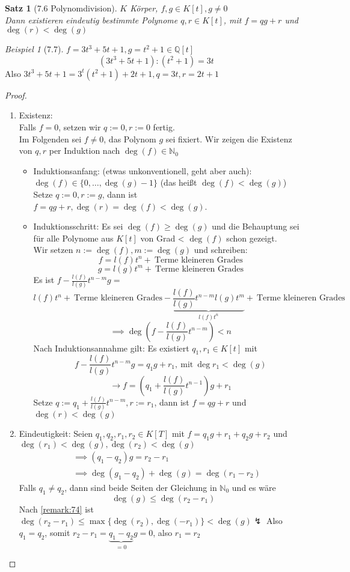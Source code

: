 \documentclass[a4paper]{scrartcl}
\theoremstyle{definition}
\theoremstyle{plain}
\newtheorem{thm}{Satz}
\theoremstyle{plain}
\theoremstyle{remark}
\theoremstyle{remark}
\theoremstyle{remark}
\theoremstyle{remark}
\theoremstyle{remark}
\newtheorem{ex}{Beispiel}
\begin{document}
\begin{thm}[7.6 Polynomdivision]
\label{thm:poly_div}
$K$ Körper, $f,g\in K[t], g\neq 0$ \\
  Dann existieren eindeutig bestimmte Polynome $q,r \in K[t]$, mit $f = q g + r$ und $\deg(r) < \deg(g)$
\end{thm}

\begin{ex}[7.7]
$f = 3 t^3 + 5 t + 1, g = t^2 + 1 \in\mathbb{Q}[t]$
\[(3 t^3 + 5 t + 1) : (t ^2 + 1) = 3 t\]
Also $3 t^3 + 5t + 1 = 3^t (t^2 + 1) + 2 t + 1, q = 3 t, r = 2 t + 1$
\end{ex}

\begin{proof}
\begin{enumerate}
\item Existenz: \\
         Falls $f = 0$, setzen wir $q := 0, r:= 0$ fertig. \\
         Im Folgenden sei $f\neq 0$, das Polynom $g$ sei fixiert. Wir zeigen die Existenz von $q,r$ per Induktion nach $\deg(f) \in\mathbb{N}_0$ \\
\begin{itemize}
\item Induktionsanfang: (etwas unkonventionell, geht aber auch): $\deg(f) \in \{0,\ldots,\deg(g) - 1\}$ (das heißt $\deg(f) < \deg(g)$) \\
           Setze $q:= 0, r:= g$, dann ist $f = q g + r, \deg(r) = \deg(f) < \deg(g)$.
\item Induktionsschritt: Es sei $\deg(f) \geq \deg(g)$ und die Behauptung sei für alle Polynome aus $K[t]$ von Grad < $\deg(f)$ schon gezeigt. \\
           Wir setzen $n:= \deg(f), m:=\deg(g)$ und schreiben:
\[f = l(f)t^n + ~\text{Terme kleineren Grades}\]
\[g = l(g) t^m + ~\text{Terme kleineren Grades}\]
Es ist $f - \frac{l(f)}{l(g)}t^{n - m}g =$
\[l(f) t^n + ~\text{Terme kleineren Grades} - \underbrace{\frac{l(f)}{l(g)} t^{n - m}l(g) t^m}_{l(f)t^n} + ~\text{Terme kleineren Grades}\]
\[\implies \deg(f - \frac{l(f)}{l(g)}t^{n - m}) < n\]
Nach Induktionsannahme gilt: Es existiert $q_1,r_1 \in K[t]$ mit
\[f - \frac{l(f)}{l(g)}t^{n -m}g = q_1 g + r_1, ~\text{mit}~\deg{r_1} < \deg(g)\]
\[\rightarrow f = (q_1 + \frac{l(f)}{l(g)} t^{n - 1})g + r_1\]
Setze $q:= q_1 + \frac{l(f)}{l(g)}t^{n - m}, r:= r_1$, dann ist $f = q g + r$ und $\deg(r) < \deg(g)$
\end{itemize}
\item Eindeutigkeit: Seien $q_1,q_2,r_1,r_2\in K[T]$ mit $f = q_1 g + r_1 + q_2 g + r_2$ und $\deg(r_1) < \deg(g), \deg(r_2) < \deg(g)$
\begin{align*}
&\implies (q_1 - q_2) g = r_2 - r_1 \\
&\implies \deg(g_1 - q_2) + \deg(g) = \deg(r_1 - r_2)
\end{align*}
Falls $q_1 \neq q_2$, dann sind beide Seiten der Gleichung in $\mathbb{N}_0$ und es wäre
\[\deg(g) \leq \deg(r_2 - r_1)\]
Nach \ref{remark:74} ist $\deg(r_2 - r_1) \leq \max\{\deg(r_2),\deg(-r_1)\} < \deg(g) \lightning$
Also $q_1 = q_2$, somit $r_2 - r_1 = \underbrace{q_1 - q_2}_{= 0} g = 0$, also $r_1 = r_2$
\end{enumerate}
\end{proof}
\end{document}
